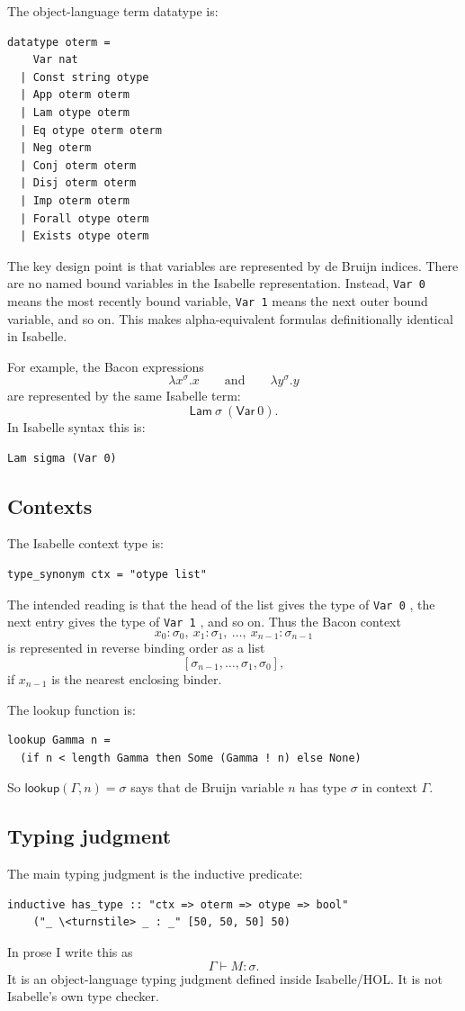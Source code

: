 \documentclass[12pt,leqno]{article}
\newcommand{\code}[1]{%
  \begingroup
  \def\_{\char`\_\allowbreak}%
  \texttt{#1}%
  \endgroup
}
\newcommand{\Var}{\mathsf{Var}}
\newcommand{\Lam}{\mathsf{Lam}}
\newcommand{\lookup}{\mathsf{lookup}}
\newcommand{\types}{\mathrel{\vdash}}
\begin{document}
The object-language term datatype is:
\begin{verbatim}
datatype oterm =
    Var nat
  | Const string otype
  | App oterm oterm
  | Lam otype oterm
  | Eq otype oterm oterm
  | Neg oterm
  | Conj oterm oterm
  | Disj oterm oterm
  | Imp oterm oterm
  | Forall otype oterm
  | Exists otype oterm
\end{verbatim}

The key design point is that variables are represented by de Bruijn indices.
There are no named bound variables in the Isabelle representation.  Instead,
\code{Var 0} means the most recently bound variable, \code{Var 1} means the
next outer bound variable, and so on.  This makes alpha-equivalent formulas
definitionally identical in Isabelle.

For example, the Bacon expressions
\[
  \lambda x^\sigma.x
  \qquad\text{and}\qquad
  \lambda y^\sigma.y
\]
are represented by the same Isabelle term:
\[
  \Lam\ \sigma\ (\Var\ 0).
\]
In Isabelle syntax this is:
\begin{verbatim}
Lam sigma (Var 0)
\end{verbatim}

\subsection{Contexts}

The Isabelle context type is:
\begin{verbatim}
type_synonym ctx = "otype list"
\end{verbatim}
The intended reading is that the head of the list gives the type of
\code{Var 0}, the next entry gives the type of \code{Var 1}, and so on.  Thus
the Bacon context
\[
  x_0:\sigma_0,\ x_1:\sigma_1,\ \ldots,\ x_{n-1}:\sigma_{n-1}
\]
is represented in reverse binding order as a list
\[
  [\sigma_{n-1},\ldots,\sigma_1,\sigma_0],
\]
if $x_{n-1}$ is the nearest enclosing binder.

The lookup function is:
\begin{verbatim}
lookup Gamma n =
  (if n < length Gamma then Some (Gamma ! n) else None)
\end{verbatim}
So $\lookup(\Gamma,n)=\sigma$ says that de Bruijn variable $n$ has type
$\sigma$ in context $\Gamma$.

\subsection{Typing judgment}

The main typing judgment is the inductive predicate:
\begin{verbatim}
inductive has_type :: "ctx => oterm => otype => bool"
    ("_ \<turnstile> _ : _" [50, 50, 50] 50)
\end{verbatim}
In prose I write this as
\[
  \Gamma \types M:\sigma.
\]
It is an object-language typing judgment defined inside Isabelle/HOL.  It is
not Isabelle's own type checker.
\end{document}

